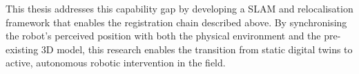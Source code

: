 This thesis addresses this capability gap by developing a SLAM and relocalisation framework that enables the registration chain described above. By synchronising the robot’s perceived position with both the physical environment and the pre-existing 3D model, this research enables the transition from static digital twins to active, autonomous robotic intervention in the field.